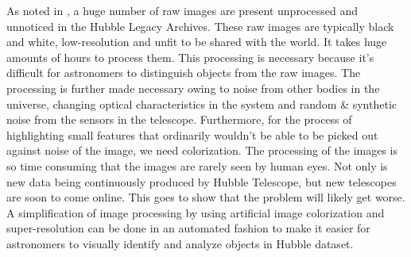\documentclass[conference]{IEEEtran}
\begin{document}
As noted in \citep{Gao2019astronomical}, a huge number of raw images are present unprocessed and unnoticed in the Hubble Legacy Archives. These raw images are typically black and white, low-resolution and unfit to be shared with the world. It takes huge amounts of hours to process them. This processing is necessary because it's difficult for astronomers to distinguish objects from the raw images. The processing is further made necessary owing to noise from other bodies in the universe, changing optical characteristics in the system and random \& synthetic noise from the sensors in the telescope. Furthermore, for the process of highlighting small features that ordinarily wouldn't be able to be picked out against noise of the image, we need colorization. The processing of the images is so time consuming that the images are rarely seen by human eyes. Not only is new data being continuously produced by Hubble Telescope, but new telescopes are soon to come online. This goes to show that the problem will likely get worse. A simplification of image processing by using artificial image colorization and super-resolution can be done in an automated fashion to make it easier for astronomers to visually identify and analyze objects in Hubble dataset.
\end{document}
